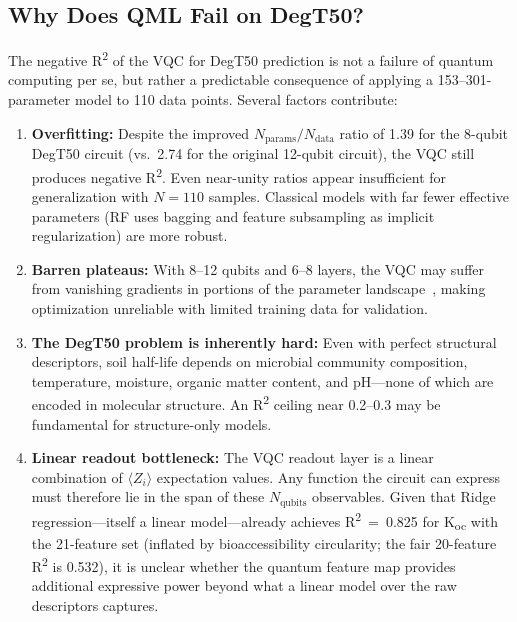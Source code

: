 \documentclass[twoside,twocolumn,9pt]{article}
\newcommand{\degtl}{DegT50}
\newcommand{\koc}{K\textsubscript{oc}}
\newcommand{\rtwo}{R\textsuperscript{2}}
\newcommand{\nsub}{110}
\begin{document}
\subsection{Why Does QML Fail on DegT50?}

The negative \rtwo{} of the VQC for \degtl{} prediction is not a failure
of quantum computing per se, but rather a predictable consequence of
applying a 153--301-parameter model to \nsub{} data points. Several
factors contribute:

\begin{enumerate}
  \item \textbf{Overfitting:} Despite the improved
        $N_\text{params}/N_\text{data}$ ratio of 1.39 for the 8-qubit
        \degtl{} circuit (vs.\ 2.74 for the original 12-qubit circuit),
        the VQC still produces negative \rtwo{}. Even near-unity ratios
        appear insufficient for generalization with $N = 110$ samples.
        Classical models with far fewer effective parameters (RF uses
        bagging and feature subsampling as implicit regularization) are
        more robust.

  \item \textbf{Barren plateaus:} With 8--12 qubits and 6--8
        layers, the VQC may suffer from vanishing gradients in portions of
        the parameter landscape~\cite{mcclean2018}, making optimization
        unreliable with limited training data for validation.

  \item \textbf{The DegT50 problem is inherently hard:} Even with perfect
        structural descriptors, soil half-life depends on microbial
        community composition, temperature, moisture, organic matter
        content, and pH---none of which are encoded in molecular structure.
        An \rtwo{} ceiling near 0.2--0.3 may be fundamental for
        structure-only models.

  \item \textbf{Linear readout bottleneck:} The VQC readout layer is a
        linear combination of $\langle Z_i \rangle$ expectation values.
        Any function the circuit can express must therefore lie in the
        span of these $N_\text{qubits}$ observables. Given that Ridge
        regression---itself a linear model---already achieves \rtwo{}~=~0.825
        for \koc{} with the 21-feature set (inflated by bioaccessibility
        circularity; the fair 20-feature \rtwo{} is 0.532),
        it is unclear whether the quantum feature map provides
        additional expressive power beyond what a linear model over the
        raw descriptors captures.
\end{enumerate}
\end{document}
